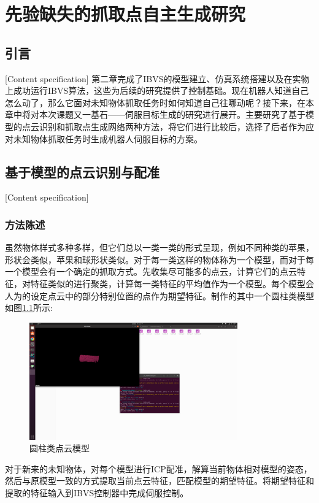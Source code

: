 \documentclass[fontset=fandol,type=bachelor,campus=harbin,bsmainpagenumberline=true]{hithesisbook}
\begin{document}
\chapter[先验缺失的抓取点自主生成研究]{先验缺失的抓取点自主生成研究}
\section{引言}[Content specification]
第二章完成了IBVS的模型建立、仿真系统搭建以及在实物上成功运行IBVS算法，这些为后续的研究提供了控制基础。现在机器人知道自己怎么动了，那么它面对未知物体抓取任务时如何知道自己往哪动呢？接下来，在本章中将对本次课题又一基石——伺服目标生成的研究进行展开。主要研究了基于模型的点云识别和抓取点生成网络两种方法，将它们进行比较后，选择了后者作为应对未知物体抓取任务时生成机器人伺服目标的方案。


\section{基于模型的点云识别与配准}[Content specification]
\subsection{方法陈述}
虽然物体样式多种多样，但它们总以一类一类的形式呈现，例如不同种类的苹果，形状会类似，苹果和球形状类似。对于每一类这样的物体称为一个模型，而对于每一个模型会有一个确定的抓取方式。先收集尽可能多的点云，计算它们的点云特征，对特征类似的进行聚类，计算每一类特征的平均值作为一个模型。每个模型会人为的设定点云中的部分特别位置的点作为期望特征。制作的其中一个圆柱类模型如图\ref{圆柱类点云模型}所示:
\begin{figure}[h]
\centering
\includegraphics[width = 0.8\textwidth]{chapter3/三维圆柱点云模型}
\caption{圆柱类点云模型}
\label{圆柱类点云模型}
\end{figure}


对于新来的未知物体，对每个模型进行ICP配准，解算当前物体相对模型的姿态，然后与原模型一致的方式提取当前点云特征，匹配模型的期望特征。将期望特征和提取的特征输入到IBVS控制器中完成伺服控制。
\end{document}
